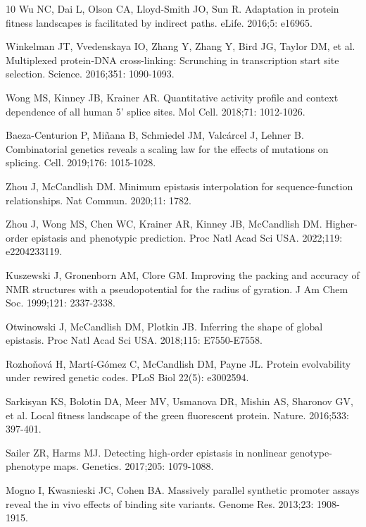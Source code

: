 \documentclass[10pt,letterpaper]{article}
\begin{document}
\begin{thebibliography}{10}
 Wu NC, Dai L, Olson CA, Lloyd-Smith JO, Sun R. Adaptation in protein fitness landscapes is facilitated by indirect paths. eLife. 2016;5: e16965. 

 Winkelman JT, Vvedenskaya IO, Zhang Y, Zhang Y, Bird JG, Taylor DM, et al. Multiplexed protein-DNA cross-linking: Scrunching in transcription start site selection. Science. 2016;351: 1090-1093. 

 Wong MS, Kinney JB, Krainer AR. Quantitative activity profile and context dependence of all human 5' splice sites. Mol Cell. 2018;71: 1012-1026. 

 Baeza-Centurion P, Mi\~{n}ana B, Schmiedel JM, Valc\'{a}rcel J, Lehner B. Combinatorial genetics reveals a scaling law for the effects of mutations on splicing. Cell. 2019;176: 1015-1028. 

 Zhou J, McCandlish DM. Minimum epistasis interpolation for sequence-function relationships. Nat Commun. 2020;11: 1782. 

 Zhou J, Wong MS, Chen WC, Krainer AR, Kinney JB, McCandlish DM. Higher-order epistasis and phenotypic prediction. Proc Natl Acad Sci USA. 2022;119: e2204233119.

 Kuszewski J, Gronenborn AM, Clore GM. Improving the packing and accuracy of NMR structures with a pseudopotential for the radius of gyration. J Am Chem Soc. 1999;121: 2337-2338. 

 Otwinowski J, McCandlish DM, Plotkin JB. Inferring the shape of global epistasis. Proc Natl Acad Sci USA. 2018;115: E7550-E7558. 

 Rozho\v{n}ov\'{a} H, Mart\'{i}-G\'{o}mez C, McCandlish DM, Payne JL. Protein evolvability under rewired genetic codes. PLoS Biol 22(5): e3002594.

 Sarkisyan KS, Bolotin DA, Meer MV, Usmanova DR, Mishin AS, Sharonov GV, et al. Local fitness landscape of the green fluorescent protein. Nature. 2016;533: 397-401. 

 Sailer ZR, Harms MJ. Detecting high-order epistasis in nonlinear genotype-phenotype maps. Genetics. 2017;205: 1079-1088.

 Mogno I, Kwasnieski JC, Cohen BA. Massively parallel synthetic promoter assays reveal the in vivo effects of binding site variants. Genome Res. 2013;23: 1908-1915.


\end{thebibliography}
\end{document}
